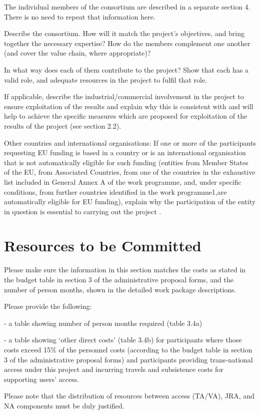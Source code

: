 \begin{todo}{}\color{red}
  The individual members of the consortium are described in a separate section 4. There is no need to repeat that information here.

  Describe the consortium. How will it match the project’s objectives, and bring together the necessary expertise? How do the members complement one another (and cover the value chain, where appropriate)? 

  In what way does each of them contribute to the project? Show that each has a valid role, and adequate resources in the project to fulfil that role. 

  If applicable, describe the industrial/commercial involvement in the project to ensure exploitation of the results and explain why this is consistent with and will help to achieve the specific measures which are proposed for exploitation of the results of the project (see section 2.2). 

  Other countries and international organisations: If one or more of the participants requesting EU funding is based in a country or is an international organisation that is not automatically eligible for such funding (entities from Member States of the EU, from Associated Countries, from one of the countries in the exhaustive list included in General Annex A of the work programme, and, under specific conditions, from further countries identified in the work programme1,are automatically eligible for EU funding), explain why the participation of the entity in question is essential to carrying out the project .
\end{todo}



\section{Resources to be Committed}\label{sec:resources}

\begin{todo}{}\color{red}
Please make sure the information in this section matches the costs as stated in the budget table in section 3 of the administrative proposal forms, and the number of person months, shown in the detailed work package descriptions.

Please provide the following:

- a table showing number of person months required (table 3.4a)

- a table showing ‘other direct costs’ (table 3.4b) for participants where those  costs exceed 15\% of the personnel costs (according to the budget  table in section 3 of the administrative proposal forms) and participants providing trans-national access under this project and incurring travels and subsistence costs for supporting users' access.

Please note that the distribution of resources between access (TA/VA), JRA, and NA components must be duly justified.
\end{todo}

